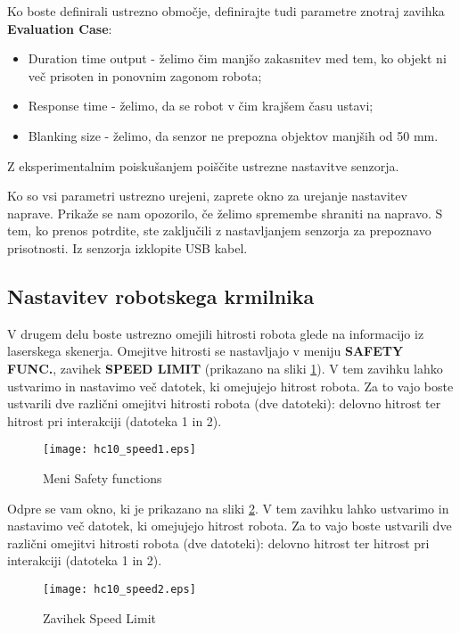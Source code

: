 Ko boste definirali ustrezno območje, definirajte tudi parametre znotraj zavihka \textbf{Evaluation Case}:
\begin{itemize}
	\item Duration time output - \v zelimo čim manjšo zakasnitev med tem, ko objekt ni več prisoten in ponovnim zagonom robota;
	\item Response time - \v zelimo, da se robot v čim krajšem času ustavi;
	\item Blanking size - \v zelimo, da senzor ne prepozna objektov manjših od 50 mm.
\end{itemize}

Z eksperimentalnim poiskušanjem poiščite ustrezne nastavitve senzorja.

Ko so vsi parametri ustrezno urejeni, zaprete okno za urejanje nastavitev naprave. Prikaže se nam opozorilo, če želimo spremembe shraniti na napravo. S tem, ko prenos potrdite, ste zaključili z nastavljanjem senzorja za prepoznavo prisotnosti. Iz senzorja izklopite USB kabel.

\subsection{Nastavitev robotskega krmilnika} \label{realni3}

V drugem delu boste ustrezno omejili hitrosti robota glede na informacijo iz laserskega skenerja. Omejitve hitrosti se nastavljajo v meniju \textbf{SAFETY FUNC.}, zavihek \textbf{SPEED LIMIT} (prikazano na sliki \ref{fig:hc10_speed1}). V tem zavihku lahko ustvarimo in nastavimo več datotek, ki omejujejo hitrost robota. Za to vajo boste ustvarili dve različni omejitvi hitrosti robota (dve datoteki): delovno hitrost ter hitrost pri interakciji (datoteka 1 in 2).

\begin{figure}[!hbt]
	\centering
	\texttt{[image: hc10\_speed1.eps]}
	\caption{Meni Safety functions}
	\label{fig:hc10_speed1}
\end{figure}

Odpre se vam okno, ki je prikazano na sliki \ref{fig:hc10_speed2}. V tem zavihku lahko ustvarimo in nastavimo več datotek, ki omejujejo hitrost robota. Za to vajo boste ustvarili dve različni omejitvi hitrosti robota (dve datoteki): delovno hitrost ter hitrost pri interakciji (datoteka 1 in 2).

\begin{figure}[!hbt]
	\centering
	\texttt{[image: hc10\_speed2.eps]}
	\caption{Zavihek Speed Limit}
	\label{fig:hc10_speed2}
\end{figure}

